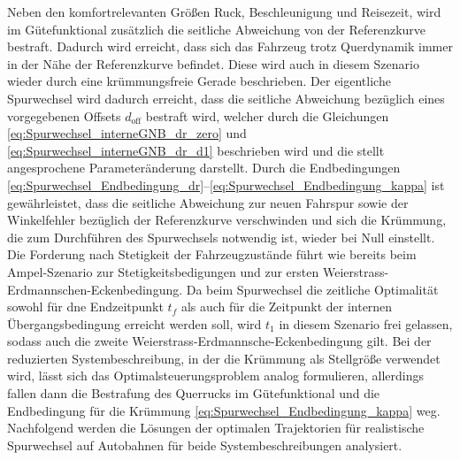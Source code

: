 Neben den komfortrelevanten Größen Ruck, Beschleunigung und Reisezeit, wird im Gütefunktional zusätzlich die seitliche Abweichung von der Referenzkurve bestraft. Dadurch wird erreicht, dass sich das Fahrzeug trotz Querdynamik immer in der Nähe der Referenzkurve befindet. Diese wird auch in diesem Szenario wieder durch eine krümmungsfreie Gerade beschrieben. Der eigentliche Spurwechsel wird dadurch erreicht, dass die seitliche Abweichung bezüglich eines vorgegebenen Offsets $d_{\textrm{off}}$ bestraft wird, welcher durch die Gleichungen \eqref{eq:Spurwechsel_interneGNB_dr_zero} und \eqref{eq:Spurwechsel_interneGNB_dr_d1} beschrieben wird und die stellt angesprochene Parameteränderung darstellt. Durch die Endbedingungen \eqref{eq:Spurwechsel_Endbedingung_dr}--\eqref{eq:Spurwechsel_Endbedingung_kappa} ist gewährleistet, dass die seitliche Abweichung zur neuen Fahrspur sowie der Winkelfehler bezüglich der Referenzkurve verschwinden und sich die Krümmung, die zum Durchführen des Spurwechsels notwendig ist, wieder bei Null einstellt. Die Forderung nach Stetigkeit der Fahrzeugzustände führt wie bereits beim Ampel-Szenario zur Stetigkeitsbedigungen und zur ersten Weierstrass-Erdmannschen-Eckenbedingung. Da beim Spurwechsel die zeitliche Optimalität sowohl für dne Endzeitpunkt $t_f$ als auch für die Zeitpunkt der internen Übergangsbedingung erreicht werden soll, wird $t_1$ in diesem Szenario frei gelassen, sodass auch die zweite Weierstrass-Erdmannsche-Eckenbedingung gilt. Bei der reduzierten Systembeschreibung, in der die Krümmung als Stellgröße verwendet wird, lässt sich das Optimalsteuerungsproblem analog formulieren, allerdings fallen dann die Bestrafung des Querrucks im Gütefunktional und die Endbedingung für die Krümmung \eqref{eq:Spurwechsel_Endbedingung_kappa} weg. Nachfolgend werden die Lösungen der optimalen Trajektorien für realistische Spurwechsel auf Autobahnen für beide Systembeschreibungen analysiert.

